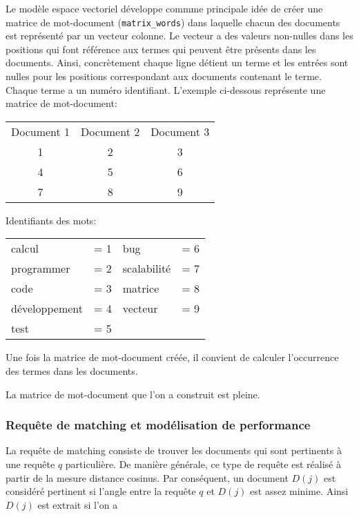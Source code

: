 Le modèle espace vectoriel développe commme principale idée
de créer une matrice de mot-document ({\tt matrix\_words})
dans laquelle chacun des documents est représenté par
un vecteur colonne.
Le vecteur a des valeurs non-nulles dans les positions qui font
référence aux termes qui peuvent être présents dans les documents.
Ainsi, concrètement chaque ligne détient un terme et les entrées
sont nulles pour les positions correspondant aux documents
contenant le terme.
Chaque terme a un numéro identifiant.
L'exemple ci-dessous représente une matrice de mot-document:

\begin{center}
\begin{tabular}{ccc}
Document 1 & Document 2 & Document 3 \\
1          & 2          & 3 \\
4          & 5          & 6 \\
7          & 8          & 9
\end{tabular}
\end{center}

Identifiants des mots:

\begin{center}
\begin{tabular}{ll|ll}
calcul        & = 1 & bug         & = 6 \\
programmer    & = 2 & scalabilité & = 7 \\
code          & = 3 & matrice     & = 8 \\
développement & = 4 & vecteur     & = 9 \\
test          & = 5
\end{tabular}
\end{center}

Une fois la matrice de mot-document créée,
il convient de calculer l'occurrence des termes
dans les documents.

La matrice de mot-document que l'on a construit est pleine.

\subsubsection{Requête de matching et modélisation de performance}

La  requête de matching consiste de trouver les documents qui sont
pertinents à une requête $q$ particulière.
De manière générale, ce type de requête est réalisé à partir
de la mesure distance cosinus.
Par conséquent, un document $D(j)$ est considéré pertinent
si l'angle entre la requête $q$ et $D(j)$ est assez minime.
Ainsi $D(j)$ est extrait si l'on a

